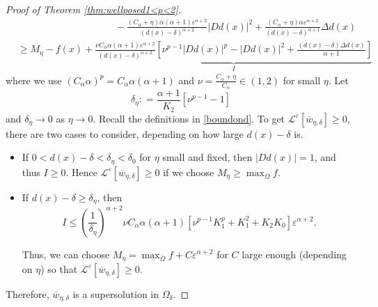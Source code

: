 \documentclass[12pt,reqno]{amsart}
\numberwithin{figure}{section}
\theoremstyle{plain}
\theoremstyle{remark}
\numberwithin{equation}{section}
\begin{document}
\begin{proof} [Proof of Theorem \ref{thm:wellposed1<p<2}]
\begin{align*}
    & \qquad\qquad\qquad\qquad\qquad - \frac{(C_\alpha+\eta)\alpha(\alpha+1)\varepsilon^{\alpha+2}}{(d(x)-\delta)^{\alpha+2}}|D d(x)|^2 + \frac{(C_\alpha+\eta)\alpha \varepsilon^{\alpha+2}}{(d(x)-\delta)^{\alpha+1}}\Delta d(x)\\
    &\geq M_\eta - f(x) + \underbrace{\frac{\nu C_\alpha\alpha(\alpha+1)\varepsilon^{\alpha+2}}{(d(x)-\delta)^{\alpha+2}}\left[\nu^{p-1}|Dd(x)|^{p} - |Dd(x)|^2 + \frac{(d(x)-\delta)\Delta d(x)}{\alpha+1}\right]}_{I}
\end{align*}
where we use $(C_\alpha\alpha)^p = C_\alpha\alpha(\alpha+1)$ and $\nu = \frac{C_\alpha+\eta}{C_\alpha} \in (1,2)$ for small $\eta$. Let
\begin{equation*}
    \delta_\eta : = \frac{\alpha+1}{K_2}\left[\nu^{p-1}-1\right]
\end{equation*}
and $\delta_\eta \to 0$ as $\eta \to 0$.
Recall the definitions in \eqref{boundond}. To get  $\mathcal{L}^\varepsilon\left[\overline{w}_{\eta,\delta}\right]\geq 0$, there are two cases to consider, depending on how large $d(x)-\delta$ is.
\begin{itemize}
    \item If $0< d(x)-\delta <\delta_\eta < \delta_0$ for $\eta$ small and fixed, then $|Dd(x)| = 1$, and thus $I\geq 0$. Hence $\mathcal{L}^\varepsilon\left[\overline{w}_{\eta,\delta}\right]\geq 0$ if we choose $M_\eta \geq \max_{\overline{\Omega}} f$.
    \item If $d(x)-\delta\geq \delta_\eta$, then 
    \begin{equation*}
        I \leq \left(\frac{1}{\delta_\eta}\right)^{\alpha+2}\nu C_\alpha \alpha(\alpha+1)\left[\nu^{p-1}K_1^{p}+K_1^2+K_2K_0\right]\varepsilon^{\alpha+2}.
    \end{equation*}
    
    Thus, we can choose $M_\eta = \max_{\overline{\Omega}} f + C\varepsilon^{\alpha+2}$ for $C$ large enough (depending on $\eta$) so that  $\mathcal{L}^\varepsilon\left[\overline{w}_{\eta,\delta}\right]\geq 0$.
\end{itemize}
Therefore, $\overline{w}_{\eta,\delta}$ is a supersolution in $\Omega_\delta$. 


\end{proof}
\end{document}

